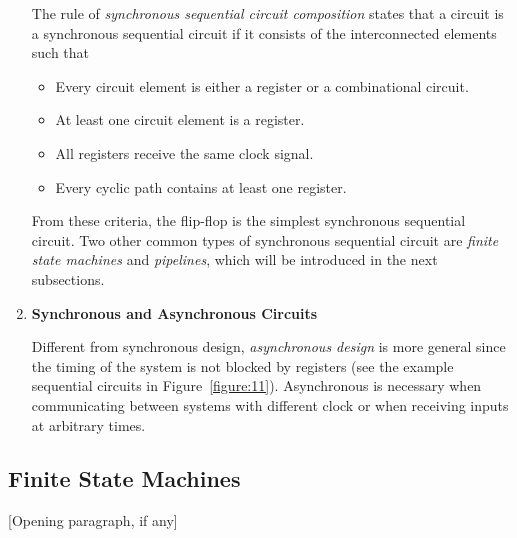 \documentclass[12pt]{article}
\begin{document}
\begin{enumerate}
    The rule of \textit{synchronous sequential circuit composition} states that a circuit is a synchronous sequential circuit if it consists of the interconnected elements such that

    \begin{itemize}
        \item Every circuit element is either a register or a combinational circuit.
        \item At least one circuit element is a register.
        \item All registers receive the same clock signal.
        \item Every cyclic path contains at least one register.
    \end{itemize}

    From these criteria, the flip-flop is the simplest synchronous sequential circuit. Two other common types of synchronous sequential circuit are \textit{finite state machines} and \textit{pipelines}, which will be introduced in the next subsections.

    \item \textbf{Synchronous and Asynchronous Circuits}

    Different from synchronous design, \textit{asynchronous design} is more general since the timing of the system is not blocked by registers (see the example sequential circuits in Figure~\ref{figure:11}). Asynchronous is necessary when communicating between systems with different clock or when receiving inputs at arbitrary times.
\end{enumerate}

\subsection{Finite State Machines}

[Opening paragraph, if any]
\end{document}
